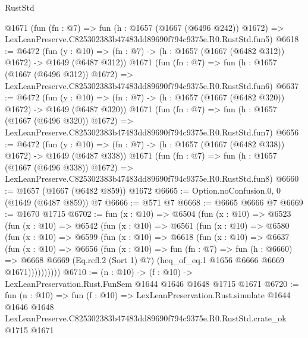 \begin{lexlean}{RustStd}
\begin{coremodule}
    @1671
    (fun (fn : @7) =>
    fun (h : @1657 (@1667 (@6496 @242)) @1672) =>
    LexLeanPreserve.C825302383b47483dd89690f794c9375e.R0.RustStd.fun5)
@6618 := @6472
    (fun (y : @10) => (fn : @7) -> (h : @1657 (@1667 (@6482 @312)) @1672) -> @1649 (@6487 @312))
    @1671
    (fun (fn : @7) =>
    fun (h : @1657 (@1667 (@6496 @312)) @1672) =>
    LexLeanPreserve.C825302383b47483dd89690f794c9375e.R0.RustStd.fun6)
@6637 := @6472
    (fun (y : @10) => (fn : @7) -> (h : @1657 (@1667 (@6482 @320)) @1672) -> @1649 (@6487 @320))
    @1671
    (fun (fn : @7) =>
    fun (h : @1657 (@1667 (@6496 @320)) @1672) =>
    LexLeanPreserve.C825302383b47483dd89690f794c9375e.R0.RustStd.fun7)
@6656 := @6472
    (fun (y : @10) => (fn : @7) -> (h : @1657 (@1667 (@6482 @338)) @1672) -> @1649 (@6487 @338))
    @1671
    (fun (fn : @7) =>
    fun (h : @1657 (@1667 (@6496 @338)) @1672) =>
    LexLeanPreserve.C825302383b47483dd89690f794c9375e.R0.RustStd.fun8)
@6660 := @1657 (@1667 (@6482 @859)) @1672
@6665 := Option.noConfusion.{0, 0} (@1649 (@6487 @859)) @7
@6666 := @571 @7
@6668 := @6665 @6666 @7
@6669 := @1670 @1715
@6702 := fun (x : @10) =>
  @6504
    (fun (x : @10) =>
    @6523
      (fun (x : @10) =>
      @6542
        (fun (x : @10) =>
        @6561
          (fun (x : @10) =>
          @6580
            (fun (x : @10) =>
            @6599
              (fun (x : @10) =>
              @6618
                (fun (x : @10) =>
                @6637
                  (fun (x : @10) =>
                  @6656
                    (fun (x : @10) =>
                    fun (fn : @7) =>
                    fun (h : @6660) =>
                    @6668
                      @6669
                      (Eq.refl.{2} (Sort 1) @7)
                      (heq_of_eq.{1} @1656 @6666 @6669 @1671))))))))))
@6710 := (n : @10) -> (f : @10) -> LexLeanPreservation.Rust.FunSem @1644 @1646 @1648 @1715 @1671
@6720 := fun (n : @10) =>
  fun (f : @10) =>
  LexLeanPreservation.Rust.simulate
    @1644
    @1646
    @1648
    LexLeanPreserve.C825302383b47483dd89690f794c9375e.R0.RustStd.crate_ok
    @1715
    @1671
\end{coremodule}
\end{lexlean}
